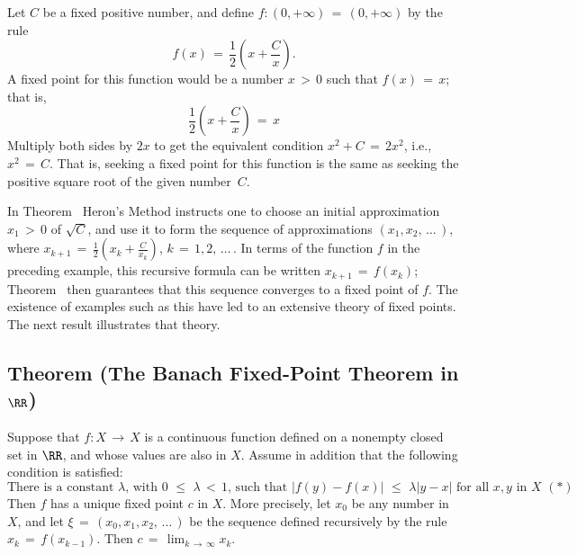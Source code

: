 \V

        Let $C$ be a fixed positive number, and define $f:(0,+{\infty}) \,=\, (0,+{\infty})$ by the rule
        \begin{displaymath}
        f(x) \,=\, \frac{1}{2}\left(x+\frac{C}{x}\right).
        \end{displaymath}
    A fixed point for this function would be a number $x\,>\,0$ such that $f(x) \,=\, x$; that is,
        \begin{displaymath}
        \frac{1}{2}\left(x+\frac{C}{x}\right) \,=\, x
        \end{displaymath}
    Multiply both sides by $2x$ to get the equivalent condition $x^{2} + C \,=\, 2x^{2}$, i.e., $x^{2} \,=\, C$.
    That is, seeking a fixed point for this function is the same as seeking the positive square root of the given number~$C$.

\V

        In Theorem~ Heron's Method instructs one to choose an initial approximation $x_{1}\,>\,0$ of $\sqrt{C}$,
    and use it to form the sequence of approximations $(x_{1},x_{2},\,{\ldots}\,)$, where $x_{k+1} \,=\, {\displaystyle \frac{1}{2}\left(x_{k} + \frac{C}{x_{k}}\right)}$, $k \,=\, 1,2,\,{\ldots}\,$.
    In terms of the function $f$ in the preceding example, this recursive formula can be written $x_{k+1} \,=\, f(x_{k})$;
    Theorem~ then guarantees that this sequence converges to a fixed point of $f$.
    The existence of examples such as this have led to an extensive theory of fixed points.
    The next result illustrates that theory.

\V

             \subsection{\small{\bf Theorem} (The Banach Fixed-Point Theorem in ${\RR}$)}
            \label{ThmF35.60}

\V

        Suppose that $f:X \,{\rightarrow}\, X$ is a continuous function defined on a nonempty closed set in ${\RR}$,
    and whose values are also in $X$. Assume in addition that the following condition is satisfied:
        \begin{displaymath}
        \mbox{There is a constant ${\lambda}$, with $0\,\,{\leq}\,\,{\lambda}\,<\,1$, such that
    $|f(y)-f(x)|\,\,{\leq}\,\,{\lambda}|y-x|$ for all $x,y$ in $X$~$({\ast})$}
        \end{displaymath}
\noindent Then $f$ has a unique fixed point $c$ in $X$. More precisely, let $x_{0}$ be any number in $X$,
    and let ${\xi} \,=\, (x_{0},x_{1},x_{2},\,{\ldots}\,)$ be the sequence defined recursively by the rule $x_{k} \,=\, f(x_{k-1})$.
    Then $c \,=\, \lim_{k \,{\rightarrow}\, {\infty}} x_{k}$.

